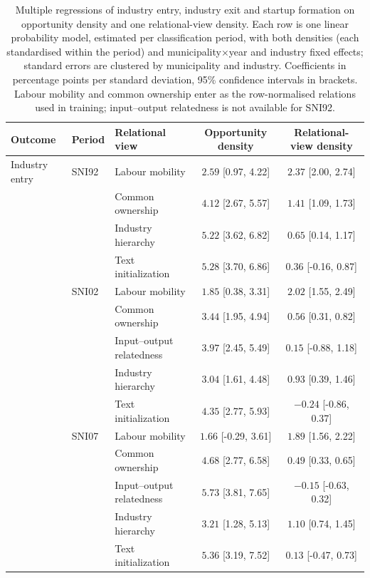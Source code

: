 \begin{table}[htbp]
\centering
\scriptsize
\caption{Multiple regressions of industry entry, industry exit and startup formation on opportunity density and one relational-view density. Each row is one linear probability model, estimated per classification period, with both densities (each standardised within the period) and municipality$\times$year and industry fixed effects; standard errors are clustered by municipality and industry. Coefficients in percentage points per standard deviation, 95\% confidence intervals in brackets. Labour mobility and common ownership enter as the row-normalised relations used in training; input--output relatedness is not available for SNI92.}
\label{tab:multiple_regression}
\begin{tabular}{lllcc}
\toprule
Outcome & Period & Relational view & Opportunity density & Relational-view density \\
\midrule
Industry entry & SNI92 & Labour mobility & $2.59$ [0.97, 4.22] & $2.37$ [2.00, 2.74] \\
 &  & Common ownership & $4.12$ [2.67, 5.57] & $1.41$ [1.09, 1.73] \\
 &  & Industry hierarchy & $5.22$ [3.62, 6.82] & $0.65$ [0.14, 1.17] \\
 &  & Text initialization & $5.28$ [3.70, 6.86] & $0.36$ [-0.16, 0.87] \\
\addlinespace[2pt]
 & SNI02 & Labour mobility & $1.85$ [0.38, 3.31] & $2.02$ [1.55, 2.49] \\
 &  & Common ownership & $3.44$ [1.95, 4.94] & $0.56$ [0.31, 0.82] \\
 &  & Input--output relatedness & $3.97$ [2.45, 5.49] & $0.15$ [-0.88, 1.18] \\
 &  & Industry hierarchy & $3.04$ [1.61, 4.48] & $0.93$ [0.39, 1.46] \\
 &  & Text initialization & $4.35$ [2.77, 5.93] & $-0.24$ [-0.86, 0.37] \\
\addlinespace[2pt]
 & SNI07 & Labour mobility & $1.66$ [-0.29, 3.61] & $1.89$ [1.56, 2.22] \\
 &  & Common ownership & $4.68$ [2.77, 6.58] & $0.49$ [0.33, 0.65] \\
 &  & Input--output relatedness & $5.73$ [3.81, 7.65] & $-0.15$ [-0.63, 0.32] \\
 &  & Industry hierarchy & $3.21$ [1.28, 5.13] & $1.10$ [0.74, 1.45] \\
 &  & Text initialization & $5.36$ [3.19, 7.52] & $0.13$ [-0.47, 0.73] \\

\end{tabular}
\end{table}
